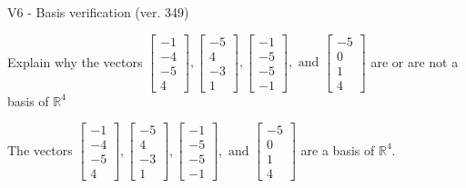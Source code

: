 \begin{exercise}
  \begin{exerciseTitle}V6 - Basis verification (ver. 349)\end{exerciseTitle}
  \begin{exerciseStatement}
    Explain why the vectors \(\left[\begin{array}{r}
-1 \\
-4 \\
-5 \\
4
\end{array}\right] , \left[\begin{array}{r}
-5 \\
4 \\
-3 \\
1
\end{array}\right] , \left[\begin{array}{r}
-1 \\
-5 \\
-5 \\
-1
\end{array}\right] , \text{ and } \left[\begin{array}{r}
-5 \\
0 \\
1 \\
4
\end{array}\right]\) are or are not a basis of \(\mathbb{R}^4\)	


  \end{exerciseStatement}
  \begin{exerciseAnswer}
   The vectors \(\left[\begin{array}{r}
-1 \\
-4 \\
-5 \\
4
\end{array}\right] , \left[\begin{array}{r}
-5 \\
4 \\
-3 \\
1
\end{array}\right] , \left[\begin{array}{r}
-1 \\
-5 \\
-5 \\
-1
\end{array}\right] , \text{ and } \left[\begin{array}{r}
-5 \\
0 \\
1 \\
4
\end{array}\right]\) 
  	 are  a basis of \(\mathbb{R}^4\).
  


  \end{exerciseAnswer}
\end{exercise}
